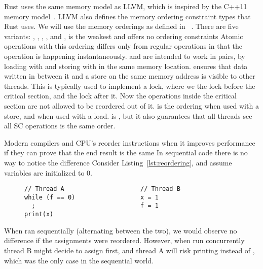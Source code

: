 \documentclass[b5paper]{report}
\begin{document}
Rust uses the same memory model as LLVM, which is inspired by the C++11 memory
model~\cite{llvmmm}. LLVM also defines the memory ordering constraint types that
Rust uses. We will use the memory orderings as defined in
~\cite{rust-ordering}. There are five variants:
, , , , and
,  is the weakest and offers no ordering
constraints Atomic operations with this ordering differs only from regular
operations in that the operation is happening instantaneously.
 and  are intended to work in pairs, by loading with
 and storing with  in the same memory location.
 ensures that data written in between it and a 
store on the same memory address is visible to other threads. This is typically
used to implement a lock, where we  the lock before the critical
section, and  the lock after it. Now the operations inside the
critical section are not allowed to be reordered out of it.
 is the  ordering when used with a store, and
 when used with a load.  is , but it
also guarantees that all threads see all SC operations is the same order.


Modern compilers and CPU's reorder instructions when it improves
performance if they can prove that the end result is the same In sequential
code there is no way to notice the difference Consider
Listing~\ref{lst:reordering}, and assume variables are initialized to 0.
\begin{figure}[ht]
\begin{lstlisting}[caption=Instruction reordering,label=lst:reordering]
// Thread A                     // Thread B
while (f == 0)                  x = 1
  ;                             f = 1
print(x)
\end{lstlisting}
\end{figure}
When ran sequentially (alternating between the two), we would observe no
difference if the assignments were reordered. However, when run concurrently
thread B might decide to assign  first, and thread A will risk
printing  instead of , which was the only case in the
sequential world.
\end{document}
